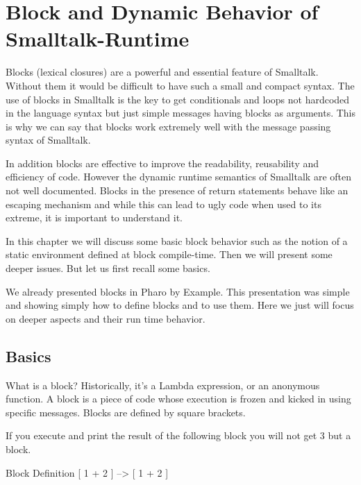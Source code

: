\documentclass[a4paper,10pt,twoside]{book}
\begin{document}
\fi
\sloppy
\chapter{Block and Dynamic Behavior of Smalltalk-Runtime}



Blocks (lexical closures) are a powerful and essential feature of Smalltalk. Without them it
would be difficult to have such a small and compact syntax. The use of blocks in Smalltalk
is the key to get conditionals and loops not hardcoded in the language syntax but just 
simple messages having blocks as arguments. This is why we can say that 
blocks work extremely well with the message passing syntax of Smalltalk.

In addition blocks are  effective to improve the readability, reusability and efficiency of code. 
However the dynamic runtime semantics of Smalltalk are often not well documented. Blocks in the presence of return statements behave like an escaping mechanism and while this can lead to ugly code when used to its extreme, it is important to understand it. 

In this chapter we will discuss some basic block behavior such as the notion of a static environment defined at block compile-time. Then we will present some deeper issues. But let us first recall some basics.

We already presented blocks in Pharo by Example. This presentation was simple and showing simply how to define blocks and to use them. Here we just will focus on deeper aspects and their run time behavior. 

\section{Basics}
What is a block? Historically, it's a Lambda expression, or an anonymous function. A block is a piece of code whose execution is frozen and kicked in using  specific messages.  Blocks are defined by square brackets. 

If you execute and print the result of the following block you will not get 3 but a block. 
\begin{code}{Block Definition}
[ 1 + 2 ]
    --> [ 1 + 2 ]
\end{code}
\end{document}
